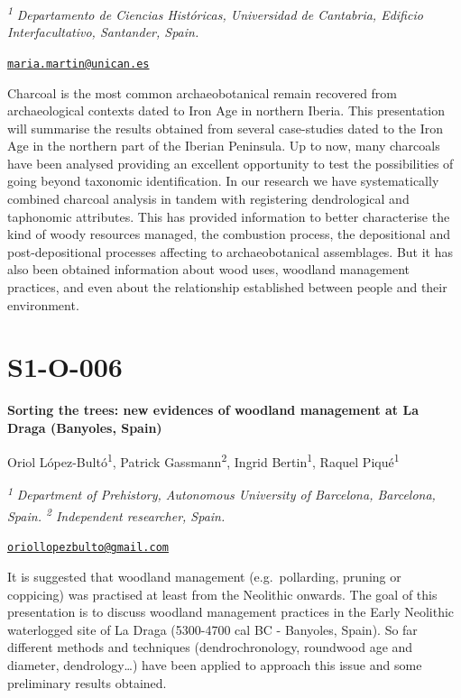 \documentclass[
]{book}
\begin{document}
\textsuperscript{\emph{1}} \emph{Departamento de Ciencias Históricas, Universidad de Cantabria, Edificio Interfacultativo, Santander, Spain.}

\href{mailto:maria.martin@unican.es}{\nolinkurl{maria.martin@unican.es}}

Charcoal is the most common archaeobotanical remain recovered from archaeological contexts dated to Iron Age in northern Iberia. This presentation will summarise the results obtained from several case-studies dated to the Iron Age in the northern part of the Iberian Peninsula. Up to now, many charcoals have been analysed providing an excellent opportunity to test the possibilities of going beyond taxonomic identification. In our research we have systematically combined charcoal analysis in tandem with registering dendrological and taphonomic attributes. This has provided information to better characterise the kind of woody resources managed, the combustion process, the depositional and post-depositional processes affecting to archaeobotanical assemblages. But it has also been obtained information about wood uses, woodland management practices, and even about the relationship established between people and their environment.

\hypertarget{s1-o-006}{%
\section*{S1-O-006}\label{s1-o-006}}

\textbf{Sorting the trees: new evidences of woodland management at La Draga (Banyoles, Spain)}

Oriol López-Bultó\textsuperscript{1}, Patrick Gassmann\textsuperscript{2}, Ingrid Bertin\textsuperscript{1}, Raquel Piqué\textsuperscript{1}

\textsuperscript{\emph{1}} \emph{Department of Prehistory, Autonomous University of Barcelona, Barcelona, Spain. \textsuperscript{2} Independent researcher, Spain.}

\href{mailto:oriollopezbulto@gmail.com}{\nolinkurl{oriollopezbulto@gmail.com}}

It is suggested that woodland management (e.g.~pollarding, pruning or coppicing) was practised at least from the Neolithic onwards. The goal of this presentation is to discuss woodland management practices in the Early Neolithic waterlogged site of La Draga (5300-4700 cal BC - Banyoles, Spain). So far different methods and techniques (dendrochronology, roundwood age and diameter, dendrology\ldots) have been applied to approach this issue and some preliminary results obtained.
\end{document}

